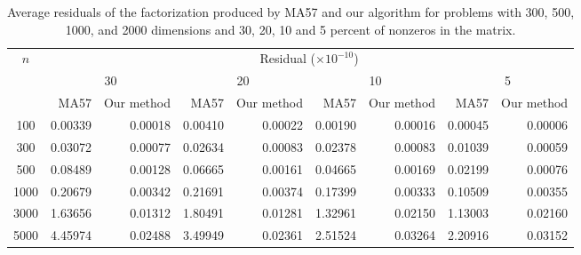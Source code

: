 \documentclass{article}
\begin{document}
\begin{table}
\caption{Average residuals of the factorization produced by MA57 and our algorithm for problems with 300, 500, 1000, and 2000 dimensions and 30, 20, 10 and 5 percent of nonzeros in the matrix.} \label{table3}
\begin{tabular}{|c|r|r|r|r|r|r|r|r|}
\hline
\multirow{3}{*}{$n$} 
&\multicolumn{8}{c|}{Residual ($\times 10^{-10}$)}\\
\cline{2-9}
&\multicolumn{2}{c|}{30}
&\multicolumn{2}{c|}{20}
&\multicolumn{2}{c|}{10}
&\multicolumn{2}{c|}{5}\\
\cline{2-9}
&MA57
&Our method
&MA57
&Our method
&MA57
&Our method
&MA57
&Our method\\
\hline
100	&	0.00339&	0.00018	&	0.00410&	0.00022	&	0.00190	&	0.00016&	0.00045	&	0.00006	\\													
300	&	0.03072&	0.00077	&	0.02634&	0.00083	&	0.02378&	0.00083	&	0.01039	&	0.00059	\\													
500	&	0.08489&	0.00128	&	0.06665&	0.00161	&	0.04665&	0.00169	&	0.02199&	0.00076	\\													
1000	&	0.20679&	0.00342	&	0.21691&	0.00374	&	0.17399&	0.00333	&	0.10509&	0.00355	\\													
3000	&	1.63656	&	0.01312&	1.80491	&	0.01281&	1.32961	&	0.02150&	1.13003	&	0.02160	\\													
5000	&	4.45974&	0.02488	&	3.49949&	0.02361	&	2.51524&	0.03264	&	2.20916&	0.03152	\\													\hline
\end{tabular}
\end{table}
\end{document}
